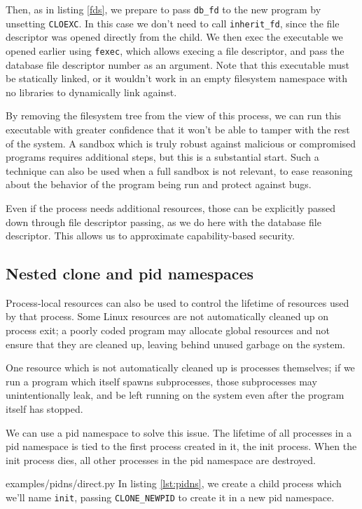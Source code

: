 \documentclass[letterpaper,twocolumn,10pt]{article}
\begin{document}
Then, as in listing \ref{fds}, we prepare to pass \texttt{db\_fd} to the new program by unsetting \texttt{CLOEXC}.
In this case we don't need to call \verb|inherit_fd|,
since the file descriptor was opened directly from the child.
We then exec the executable we opened earlier using \texttt{fexec},
which allows execing a file descriptor,
and pass the database file descriptor number as an argument.\cite{execveat}
Note that this executable must be statically linked,
or it wouldn't work in an empty filesystem namespace
with no libraries to dynamically link against.

By removing the filesystem tree from the view of this process,
we can run this executable with greater confidence
that it won't be able to tamper with the rest of the system.
A sandbox which is truly robust against malicious or compromised programs requires additional steps,
but this is a substantial start.\cite{firejail}\cite{gvisor}
Such a technique can also be used when a full sandbox is not relevant,
to ease reasoning about the behavior of the program being run
and protect against bugs.

Even if the process needs additional resources,
those can be explicitly passed down through file descriptor passing,
as we do here with the database file descriptor.
This allows us to approximate capability-based security.\cite{capsicum}
\subsection{Nested clone and pid namespaces}\label{pidns}
Process-local resources can also be used to control the lifetime of resources used by that process.
Some Linux resources are not automatically cleaned up on process exit;
a poorly coded program may allocate global resources
and not ensure that they are cleaned up,
leaving behind unused garbage on the system.

One resource which is not automatically cleaned up is processes themselves;
if we run a program which itself spawns subprocesses,
those subprocesses may unintentionally leak,
and be left running on the system even after the program itself has stopped.\cite{caternfork}

We can use a pid namespace to solve this issue.
The lifetime of all processes in a pid namespace is tied to the first process created in it,
the init process.
When the init process dies,
all other processes in the pid namespace are destroyed.\cite{pid_namespaces}


{examples/pidns/direct.py}
In listing \ref{lst:pidns},
we create a child process which we'll name \texttt{init},
passing \verb|CLONE_NEWPID| to create it in a new pid namespace.\cite{clone}
\end{document}
